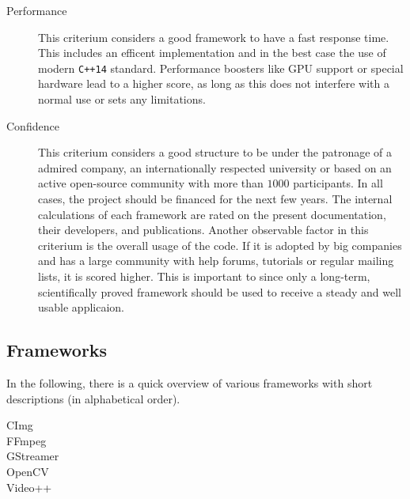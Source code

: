 \begin{description}
    \item[Performance] This criterium considers a good framework to have a fast response time. This includes an efficent implementation and in the best case the use of modern \texttt{C++14} standard. Performance boosters like GPU support or special hardware lead to a higher score, as long as this does not interfere with a normal use or sets any limitations.
    \item[Confidence] This criterium considers a good structure to be under the patronage of a admired company, an internationally respected university or based on an active open-source community with more than $1000$ participants. In all cases, the project should be financed for the next few years. The internal calculations of each framework are rated on the present documentation, their developers, and publications. Another observable factor in this criterium is the overall usage of the code. If it is adopted by big companies and has a large community with help forums, tutorials or regular mailing lists, it is scored higher. This is important to since only a long-term, scientifically proved framework should be used to receive a steady and well usable applicaion.
\end{description}

\subsection{Frameworks}\label{sec:frameworks}
In the following, there is a quick overview of various frameworks with short descriptions (in alphabetical order).
\begin{description}
    \item[CImg]
    \item[FFmpeg]
    \item[GStreamer]
    \item[OpenCV]
    \item[Video++]
\end{description}
